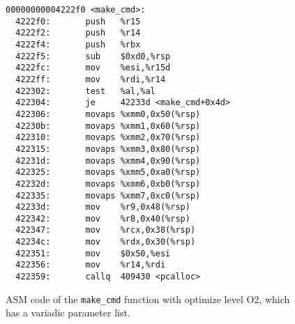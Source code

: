 \begin{figure}
\centering
\begin{center}
 \begin{lstlisting}[basicstyle=\footnotesize]
00000000004222f0 <make_cmd>:
  4222f0:       push   %r15
  4222f2:       push   %r14
  4222f4:       push   %rbx
  4222f5:       sub    $0xd0,%rsp
  4222fc:       mov    %esi,%r15d
  4222ff:       mov    %rdi,%r14
  422302:       test   %al,%al
  422304:       je     42233d <make_cmd+0x4d>
  422306:       movaps %xmm0,0x50(%rsp)
  42230b:       movaps %xmm1,0x60(%rsp)
  422310:       movaps %xmm2,0x70(%rsp)
  422315:       movaps %xmm3,0x80(%rsp)
  42231d:       movaps %xmm4,0x90(%rsp)
  422325:       movaps %xmm5,0xa0(%rsp)
  42232d:       movaps %xmm6,0xb0(%rsp)
  422335:       movaps %xmm7,0xc0(%rsp)
  42233d:       mov    %r9,0x48(%rsp)
  422342:       mov    %r8,0x40(%rsp)
  422347:       mov    %rcx,0x38(%rsp)
  42234c:       mov    %rdx,0x30(%rsp)
  422351:       mov    $0x50,%esi
  422356:       mov    %r14,%rdi
  422359:       callq  409430 <pcalloc>
\end{lstlisting}
\end{center}
\caption{ASM code of the \texttt{make\_cmd} function with optimize level O2, which has a variadic parameter list.}
\label{fig:asmvariadic}
\end{figure}
%

